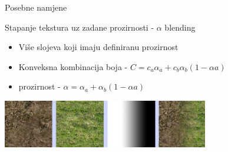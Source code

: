 \documentclass[9pt]{beamer}
\begin{document}
%
\begin{frame}{Posebne namjene}
	
	\begin{block}{Stapanje tekstura uz zadane prozirnosti - $\alpha$ blending}
		\begin{itemize}
			\item Više slojeva koji imaju definiranu prozirnost
			\item Konveksna kombinacija boja - $C = c_{a}\alpha_{a}+ c_{b}\alpha_{b}(1-\alpha{a})$ 
			\item prozirnost - $\alpha = \alpha_{a}+ \alpha_{b}(1-\alpha{a})$ 
		\end{itemize}
	\end{block}
	\begin{center}
		\includegraphics[width=9cm]{slike/07_prozirnost.png}
	\end{center}
\end{frame}

\end{document}
